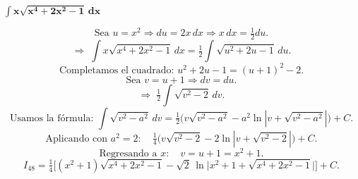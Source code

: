 $\displaystyle \mathbf{\int x\sqrt{x^{4}+2x^{2}-1}\,dx}$

\nopagebreak
$$
\text{Sea } u = x^{2} \Rightarrow du = 2x\,dx \Rightarrow x\,dx = \tfrac{1}{2}du.
$$
$$
\Rightarrow\; \int x\sqrt{x^{4}+2x^{2}-1}\,dx
= \tfrac{1}{2}\int \sqrt{u^{2}+2u-1}\,du.
$$
$$
\text{Completamos el cuadrado: } u^{2}+2u-1 = (u+1)^{2} - 2.
$$
$$
\text{Sea } v = u + 1 \Rightarrow dv = du.
$$
$$
\Rightarrow\; \tfrac{1}{2}\int \sqrt{v^{2}-2}\,dv.
$$
$$
\text{Usamos la fórmula: } 
\int \sqrt{v^{2}-a^{2}}\,dv
= \tfrac{1}{2}\big(v\sqrt{v^{2}-a^{2}} - a^{2}\ln|v+\sqrt{v^{2}-a^{2}}|\big) + C.
$$
$$
\text{Aplicando con } a^{2}=2:
\quad \tfrac{1}{4}\big(v\sqrt{v^{2}-2} - 2\ln|v+\sqrt{v^{2}-2}|\big) + C.
$$
$$
\text{Regresando a } x: \quad v = u + 1 = x^{2} + 1.
$$
$$
\boxed{
I_{48} =
\tfrac{1}{4}\Big[(x^{2}+1)\sqrt{x^{4}+2x^{2}-1}
- \sqrt{2}\,\ln\!\big|x^{2}+1+\sqrt{x^{4}+2x^{2}-1}\big|\Big] + C.
}
$$
